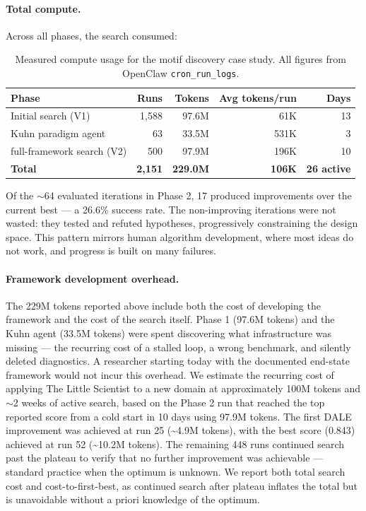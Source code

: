 \documentclass[11pt,a4paper]{article}
\begin{document}
\paragraph{Total compute.}
Across all phases, the search consumed:

\begin{table}[H]
\centering
\caption{Measured compute usage for the motif discovery case study. All figures from OpenClaw \texttt{cron\_run\_logs}.}
\label{tab:search_stats}
\small
\begin{tabular}{lrrrr}
\toprule
Phase & Runs & Tokens & Avg tokens/run & Days \\
\midrule
Initial search (V1)     & 1,588 & 97.6M  & 61K  & 13 \\
Kuhn paradigm agent     & 63    & 33.5M  & 531K & 3  \\
full-framework search (V2)        & 500   & 97.9M  & 196K & 10 \\
\midrule
\textbf{Total} & \textbf{2,151} & \textbf{229.0M} & \textbf{106K} & \textbf{26 active} \\
\bottomrule
\end{tabular}
\end{table}

Of the $\sim$64 evaluated iterations in Phase 2, 17 produced improvements over the current best --- a 26.6\% success rate. The non-improving iterations were not wasted: they tested and refuted hypotheses, progressively constraining the design space. This pattern mirrors human algorithm development, where most ideas do not work, and progress is built on many failures.

\paragraph{Framework development overhead.}
The 229M tokens reported above include both the cost of developing the framework and the cost of the search itself. Phase 1 (97.6M tokens) and the Kuhn agent (33.5M tokens) were spent discovering what infrastructure was missing --- the recurring cost of a stalled loop, a wrong benchmark, and silently deleted diagnostics. A researcher starting today with the documented end-state framework would not incur this overhead. We estimate the recurring cost of applying The Little Scientist to a new domain at approximately 100M tokens and $\sim$2 weeks of active search, based on the Phase 2 run that reached the top reported score from a cold start in 10 days using 97.9M tokens. The first DALE improvement was achieved at run 25 (\textasciitilde4.9M tokens), with the best score (0.843) achieved at run 52 (\textasciitilde10.2M tokens). The remaining 448 runs continued search past the plateau to verify that no further improvement was achievable --- standard practice when the optimum is unknown. We report both total search cost and cost-to-first-best, as continued search after plateau inflates the total but is unavoidable without a priori knowledge of the optimum.
\end{document}
